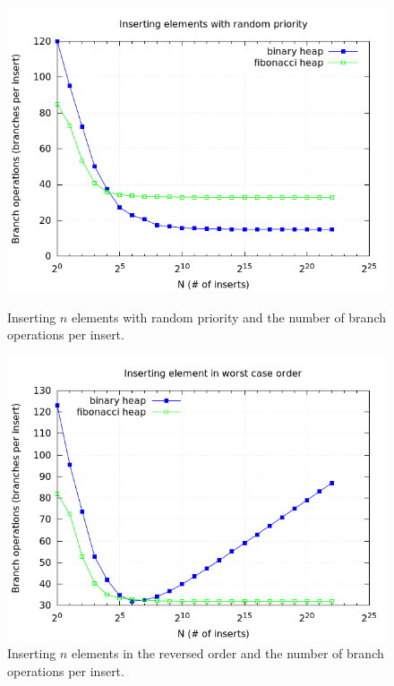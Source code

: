 \documentclass[a4paper,oneside,article,11pt]{memoir}
\begin{document}
\begin{figure}[H]
\centering
\begin{minipage}{0.48\columnwidth}
  \centering
  \includegraphics[width=\linewidth]{../res/inserts/insert_random_branch.png}%
  \caption{Inserting $n$ elements with random priority and the number of branch operations per insert.}
  \label{fig:insert_b_random}
\end{minipage}%
\hfill
\begin{minipage}{0.48\columnwidth}
  \centering
  \includegraphics[width=\linewidth]{../res/inserts/insert_worst_branch.png}%
  \caption{Inserting $n$ elements in the reversed order and the number of branch operations per insert.}
  \label{fig:insert_b_worst}
\end{minipage}
\end{figure}
\end{document}
